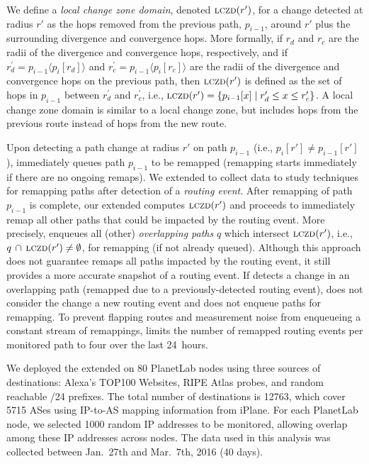 We define a \emph{local change zone domain}, denoted $\mathrm{\textsc{lczd}}(r')$,
for a change detected at radius $r'$ as the hops removed from the
previous path, $p_{i-1}$, around $r'$ plus the surrounding
divergence and convergence hops.  More formally, if $r_d$ and $r_c$
are the radii of the divergence and convergence hops, respectively,
and if $r^\prime_d = p_{i-1}\langle p_i[r_d]\rangle$ and $r^\prime_c
= p_{i-1}\langle p_i[r_c]\rangle$ are the radii of the divergence
and convergence hops on the previous path, then $\mathrm{\textsc{lczd}}(r')$ is
defined as the set of hops in $p_{i-1}$ between $r^\prime_d$ and
$r^\prime_c$, i.e., $\mathrm{\textsc{lczd}}(r') = \{p_{i-1}[x] \mid{} r^\prime_d \le
x \le r^\prime_c\}$.  A local change zone domain is similar to
a local change zone, but includes hops from the previous route
instead of hops from the new route.

  Upon detecting a path change at radius $r'$
on path $p_{i-1}$ (i.e., $p_i[r'] \ne p_{i-1}[r']$), \dtrack{}
immediately queues path $p_{i-1}$ to be remapped (remapping starts
immediately if there are no ongoing remaps).  We extended \dtrack{}
to collect data to study techniques for remapping paths after
detection of a \emph{routing event}.  After remapping of path
$p_{i-1}$ is complete, our extended \dtrack{} computes $\mathrm{\textsc{lczd}}(r')$
and proceeds to immediately remap all other paths that could be
impacted by the routing event.  More precisely, \dtrack{} enqueues
all (other) \emph{overlapping paths} $q$ which intersect
$\mathrm{\textsc{lczd}}(r')$, i.e., $q\, \cap\,\mathrm{\textsc{lczd}}(r') \ne \emptyset$, for
remapping (if not already queued).  Although this approach does not
guarantee \dtrack{} remaps all paths impacted by the routing event,
it still provides a more accurate snapshot of a routing event.  If
\dtrack{} detects a change in an overlapping path (remapped due to
a previously-detected routing event), \dtrack{} does not consider
the change a new routing event and does not enqueue paths for
remapping.  To prevent flapping routes and measurement noise from
enqueueing a constant stream of remappings, \dtrack{} limits the
number of remapped routing events per monitored path to four over
the last 24~hours.

We deployed the extended \dtrack{} on 80 PlanetLab nodes using three
sources of destinations: Alexa's TOP100 Websites,  RIPE Atlas
probes, and random reachable /24 prefixes. The total number of
destinations is 12763, which cover 5715 ASes using IP-to-AS mapping
information from iPlane. For each PlanetLab node, we selected 1000
random IP addresses to be monitored, allowing overlap among these IP
addresses across nodes. The data used in this analysis was collected
between Jan.~27th and Mar.~7th, 2016 (40 days).

